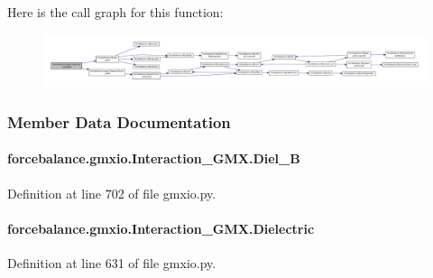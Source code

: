 Here is the call graph for this function\-:\nopagebreak
\begin{figure}[H]
\begin{center}
\leavevmode
\includegraphics[width=350pt]{classforcebalance_1_1target_1_1Target_af6099ec09486213869dba2491bd8ea04_cgraph}
\end{center}
\end{figure}




\subsubsection{Member Data Documentation}
\hypertarget{classforcebalance_1_1gmxio_1_1Interaction__GMX_a8a253cb432123a346b8a51f96fae20be}{
\paragraph[{Diel\-\_\-\-B}]{\setlength{\rightskip}{0pt plus 5cm}forcebalance.\-gmxio.\-Interaction\-\_\-\-G\-M\-X.\-Diel\-\_\-\-B}}\label{classforcebalance_1_1gmxio_1_1Interaction__GMX_a8a253cb432123a346b8a51f96fae20be}


Definition at line 702 of file gmxio.\-py.

\hypertarget{classforcebalance_1_1gmxio_1_1Interaction__GMX_af61ae542d6d62f7fa88256e1fe838815}{
\paragraph[{Dielectric}]{\setlength{\rightskip}{0pt plus 5cm}forcebalance.\-gmxio.\-Interaction\-\_\-\-G\-M\-X.\-Dielectric}}\label{classforcebalance_1_1gmxio_1_1Interaction__GMX_af61ae542d6d62f7fa88256e1fe838815}


Definition at line 631 of file gmxio.\-py.

